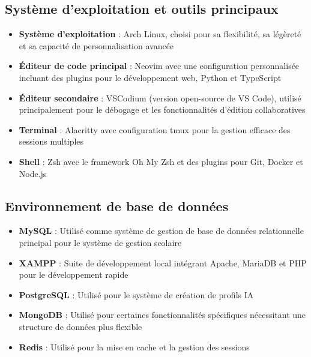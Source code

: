 \subsection{Système d'exploitation et outils principaux}

\begin{itemize}
  \item \textbf{Système d'exploitation} : Arch Linux, choisi pour sa flexibilité, sa légèreté et sa capacité de personnalisation avancée
  
  \item \textbf{Éditeur de code principal} : Neovim avec une configuration personnalisée incluant des plugins pour le développement web, Python et TypeScript
  
  \item \textbf{Éditeur secondaire} : VSCodium (version open-source de VS Code), utilisé principalement pour le débogage et les fonctionnalités d'édition collaboratives
  
  \item \textbf{Terminal} : Alacritty avec configuration tmux pour la gestion efficace des sessions multiples
  
  \item \textbf{Shell} : Zsh avec le framework Oh My Zsh et des plugins pour Git, Docker et Node.js
\end{itemize}

\subsection{Environnement de base de données}

\begin{itemize}
  \item \textbf{MySQL} : Utilisé comme système de gestion de base de données relationnelle principal pour le système de gestion scolaire
  
  \item \textbf{XAMPP} : Suite de développement local intégrant Apache, MariaDB et PHP pour le développement rapide
  
  \item \textbf{PostgreSQL} : Utilisé pour le système de création de profils IA
  
  \item \textbf{MongoDB} : Utilisé pour certaines fonctionnalités spécifiques nécessitant une structure de données plus flexible
  
  \item \textbf{Redis} : Utilisé pour la mise en cache et la gestion des sessions
\end{itemize}

